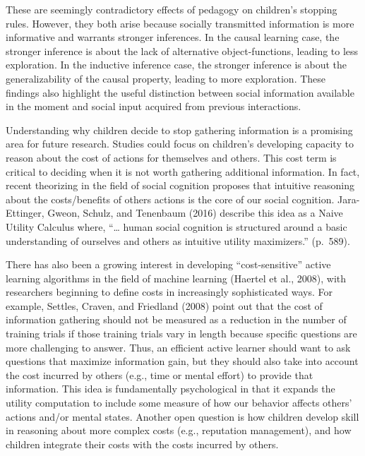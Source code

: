 \documentclass[english,floatsintext,man]{apa6}
\theoremstyle{definition}
\theoremstyle{definition}
\theoremstyle{definition}
\theoremstyle{remark}
\begin{document}
These are seemingly contradictory effects of pedagogy on children's
stopping rules. However, they both arise because socially transmitted
information is more informative and warrants stronger inferences. In the
causal learning case, the stronger inference is about the lack of
alternative object-functions, leading to less exploration. In the
inductive inference case, the stronger inference is about the
generalizability of the causal property, leading to more exploration.
These findings also highlight the useful distinction between social
information available in the moment and social input acquired from
previous interactions.

Understanding why children decide to stop gathering information is a
promising area for future research. Studies could focus on children's
developing capacity to reason about the cost of actions for themselves
and others. This cost term is critical to deciding when it is not worth
gathering additional information. In fact, recent theorizing in the
field of social cognition proposes that intuitive reasoning about the
costs/benefits of others actions is the core of our social cognition.
Jara-Ettinger, Gweon, Schulz, and Tenenbaum (2016) describe this idea as
a Naive Utility Calculus where, \enquote{\ldots{} human social cognition
is structured around a basic understanding of ourselves and others as
intuitive utility maximizers.} (p.~589).

There has also been a growing interest in developing
\enquote{cost-sensitive} active learning algorithms in the field of
machine learning (Haertel et al., 2008), with researchers beginning to
define costs in increasingly sophisticated ways. For example, Settles,
Craven, and Friedland (2008) point out that the cost of information
gathering should not be measured as a reduction in the number of
training trials if those training trials vary in length because specific
questions are more challenging to answer. Thus, an efficient active
learner should want to ask questions that maximize information gain, but
they should also take into account the cost incurred by others (e.g.,
time or mental effort) to provide that information. This idea is
fundamentally psychological in that it expands the utility computation
to include some measure of how our behavior affects others' actions
and/or mental states. Another open question is how children develop
skill in reasoning about more complex costs (e.g., reputation
management), and how children integrate their costs with the costs
incurred by others.
\end{document}
